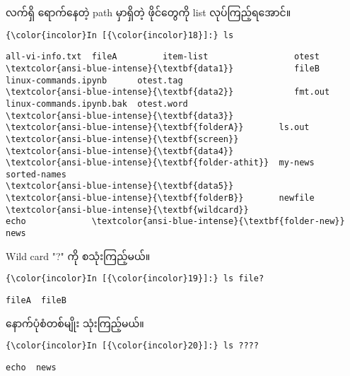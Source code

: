 \documentclass[11pt]{article}
\begin{document}
    လက်ရှိ ရောက်နေတဲ့ path မှာရှိတဲ့ ဖိုင်တွေကို list လုပ်ကြည့်ရအောင်။

    \begin{Verbatim}[commandchars=\\\{\}]
{\color{incolor}In [{\color{incolor}18}]:} ls
\end{Verbatim}

    \begin{Verbatim}[commandchars=\\\{\}]
all-vi-info.txt  fileA         item-list                 otest
\textcolor{ansi-blue-intense}{\textbf{data1}}            fileB         linux-commands.ipynb      otest.tag
\textcolor{ansi-blue-intense}{\textbf{data2}}            fmt.out       linux-commands.ipynb.bak  otest.word
\textcolor{ansi-blue-intense}{\textbf{data3}}            \textcolor{ansi-blue-intense}{\textbf{folderA}}       ls.out                    \textcolor{ansi-blue-intense}{\textbf{screen}}
\textcolor{ansi-blue-intense}{\textbf{data4}}            \textcolor{ansi-blue-intense}{\textbf{folder-athit}}  my-news                   sorted-names
\textcolor{ansi-blue-intense}{\textbf{data5}}            \textcolor{ansi-blue-intense}{\textbf{folderB}}       newfile                   \textcolor{ansi-blue-intense}{\textbf{wildcard}}
echo             \textcolor{ansi-blue-intense}{\textbf{folder-new}}    news

    \end{Verbatim}

    Wild card "?" ကို စသုံးကြည့်မယ်။

    \begin{Verbatim}[commandchars=\\\{\}]
{\color{incolor}In [{\color{incolor}19}]:} ls file?
\end{Verbatim}

    \begin{Verbatim}[commandchars=\\\{\}]
fileA  fileB

    \end{Verbatim}

    နောက်ပုံစံတစ်မျိုး သုံးကြည့်မယ်။

    \begin{Verbatim}[commandchars=\\\{\}]
{\color{incolor}In [{\color{incolor}20}]:} ls ????
\end{Verbatim}

    \begin{Verbatim}[commandchars=\\\{\}]
echo  news

    \end{Verbatim}
\end{document}
